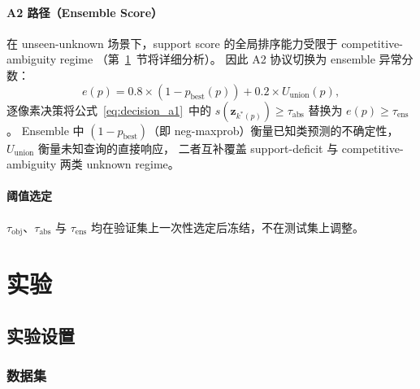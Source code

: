 \documentclass[3p,twocolumn,authoryear]{elsarticle}
\newcommand{\bz}{\mathbf{z}}                              %
\newcommand{\tobj}{\tau_{\text{obj}}}                     %
\newcommand{\tabs}{\tau_{\text{abs}}}                     %
\newcommand{\tens}{\tau_{\text{ens}}}                     %
\begin{document}
\paragraph{A2 路径（Ensemble Score）}
在 unseen-unknown 场景下，support score 的全局排序能力受限于 competitive-ambiguity regime
（第~\ref{sec:exp}~节将详细分析）。
因此 A2 协议切换为 ensemble 异常分数：
\begin{equation}\label{eq:ensemble}
  e(p) = 0.8 \times \left(1 - p_{\text{best}}(p)\right) + 0.2 \times U_{\text{union}}(p),
\end{equation}
逐像素决策将公式~\eqref{eq:decision_a1}~中的 $s(\bz_{k^*(p)}) \geq \tabs$ 替换为 $e(p) \geq \tens$。
Ensemble 中 $(1 - p_{\text{best}})$（即 neg-maxprob）衡量已知类预测的不确定性，
$U_{\text{union}}$ 衡量未知查询的直接响应，
二者互补覆盖 support-deficit 与 competitive-ambiguity 两类 unknown regime。

\paragraph{阈值选定}
$\tobj$、$\tabs$ 与 $\tens$ 均在验证集上一次性选定后冻结，不在测试集上调整。


\section{实验}\label{sec:exp}

\subsection{实验设置}\label{sec:exp:setup}

\subsubsection{数据集}\label{sec:exp:setup:data}
\end{document}
